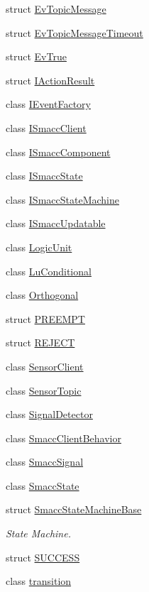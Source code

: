 \begin{DoxyCompactItemize}
struct \hyperlink{structsmacc_1_1EvTopicMessage}{Ev\+Topic\+Message}
\item 
struct \hyperlink{structsmacc_1_1EvTopicMessageTimeout}{Ev\+Topic\+Message\+Timeout}
\item 
struct \hyperlink{structsmacc_1_1EvTrue}{Ev\+True}
\item 
struct \hyperlink{structsmacc_1_1IActionResult}{I\+Action\+Result}
\item 
class \hyperlink{classsmacc_1_1IEventFactory}{I\+Event\+Factory}
\item 
class \hyperlink{classsmacc_1_1ISmaccClient}{I\+Smacc\+Client}
\item 
class \hyperlink{classsmacc_1_1ISmaccComponent}{I\+Smacc\+Component}
\item 
class \hyperlink{classsmacc_1_1ISmaccState}{I\+Smacc\+State}
\item 
class \hyperlink{classsmacc_1_1ISmaccStateMachine}{I\+Smacc\+State\+Machine}
\item 
class \hyperlink{classsmacc_1_1ISmaccUpdatable}{I\+Smacc\+Updatable}
\item 
class \hyperlink{classsmacc_1_1LogicUnit}{Logic\+Unit}
\item 
class \hyperlink{classsmacc_1_1LuConditional}{Lu\+Conditional}
\item 
class \hyperlink{classsmacc_1_1Orthogonal}{Orthogonal}
\item 
struct \hyperlink{structsmacc_1_1PREEMPT}{P\+R\+E\+E\+M\+PT}
\item 
struct \hyperlink{structsmacc_1_1REJECT}{R\+E\+J\+E\+CT}
\item 
class \hyperlink{classsmacc_1_1SensorClient}{Sensor\+Client}
\item 
class \hyperlink{classsmacc_1_1SensorTopic}{Sensor\+Topic}
\item 
class \hyperlink{classsmacc_1_1SignalDetector}{Signal\+Detector}
\item 
class \hyperlink{classsmacc_1_1SmaccClientBehavior}{Smacc\+Client\+Behavior}
\item 
class \hyperlink{classsmacc_1_1SmaccSignal}{Smacc\+Signal}
\item 
class \hyperlink{classsmacc_1_1SmaccState}{Smacc\+State}
\item 
struct \hyperlink{structsmacc_1_1SmaccStateMachineBase}{Smacc\+State\+Machine\+Base}
\begin{DoxyCompactList}\small\item\em State Machine. \end{DoxyCompactList}\item 
struct \hyperlink{structsmacc_1_1SUCCESS}{S\+U\+C\+C\+E\+SS}
\item 
class \hyperlink{classsmacc_1_1transition}{transition}
\end{DoxyCompactItemize}
